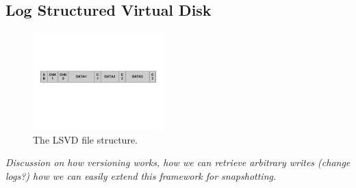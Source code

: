 \subsection{Log Structured Virtual Disk}
\label{sec:lsvd}


\begin{figure}[h]
    \includegraphics[width=0.45\textwidth, trim=0 3in 0 2in, clip]{./figures/lsvd.pdf}
    \caption{The LSVD file structure.}
    \label{fig:lsvd}
\end{figure}

\emph{Discussion on how versioning works, how we can retrieve arbitrary 
writes (change logs?) how we can easily extend this framework for snapshotting.}
